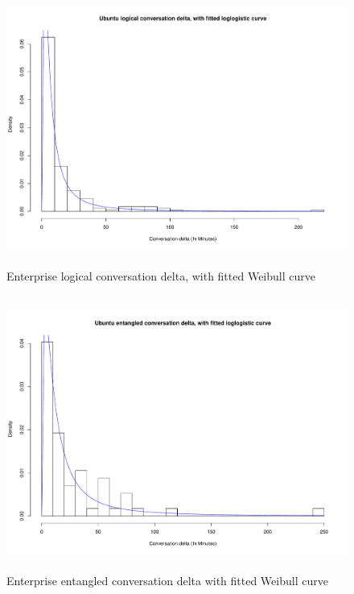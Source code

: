 \begin{figure}
\begin{center}
\caption{Enterprise logical conversation delta, with fitted Weibull curve}
\label{fig:chapt6fig6}
\includegraphics[height=9cm, width=13cm]{graphs/different/06_delta_logical_ubuntu.pdf}
\end{center}
\end{figure}

\begin{figure}
\begin{center}
\caption{Enterprise entangled conversation delta with fitted Weibull curve}
\label{fig:chapt6fig7}
\includegraphics[height=9cm, width=13cm]{graphs/different/07_delta_entangled_ubuntu.pdf} 
\end{center}
\end{figure}

